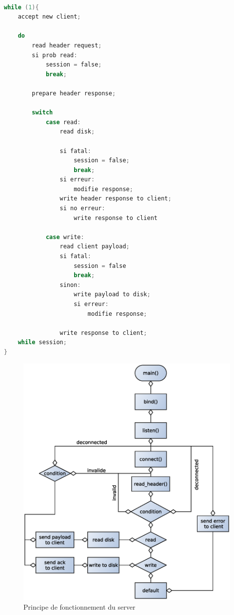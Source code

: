 \documentclass[a4paper,12pt]{article}
\begin{document}
\begin{lstlisting}[language=C, caption=pseudo code server]

while (1){
	accept new client;
	
	do 
		read header request;
		si prob read:
			session = false;
			break;
		
		prepare header response;
	
		switch
			case read:
				read disk;

				si fatal:
					session = false;
					break;			
				si erreur:
					modifie response;
				write header response to client;
				si no erreur:
					write response to client
		
			case write:
				read client payload;
				si fatal:
					session = false
					break;
				sinon:
					write payload to disk;
					si erreur:
						modifie response;
			
				write response to client;
	while session;
}			

\end{lstlisting}
\begin{figure}[H]
\begin{center}
\includegraphics[scale=.6]{imgs/schema_server}
\caption{Principe de fonctionnement du server}
\label{fig:Architecture server}
\end{center}
\end{figure}
\end{document}
